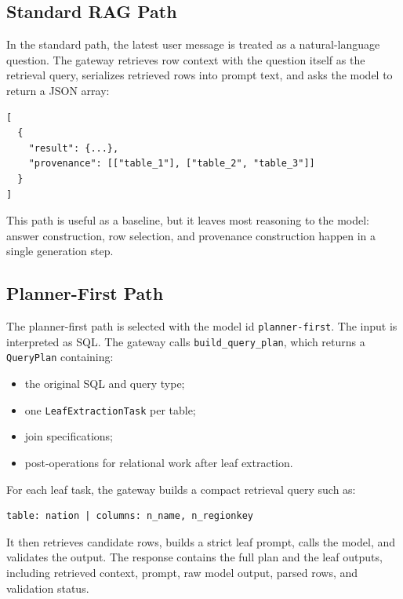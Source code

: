\documentclass[11pt,a4paper]{article}
\begin{document}
\subsection{Standard RAG Path}

In the standard path, the latest user message is treated as a natural-language
question. The gateway retrieves row context with the question itself as the
retrieval query, serializes retrieved rows into prompt text, and asks the model
to return a JSON array:

\begin{lstlisting}[style=codestyle]
[
  {
    "result": {...},
    "provenance": [["table_1"], ["table_2", "table_3"]]
  }
]
\end{lstlisting}

This path is useful as a baseline, but it leaves most reasoning to the model:
answer construction, row selection, and provenance construction happen in a
single generation step.

\subsection{Planner-First Path}

The planner-first path is selected with the model id \texttt{planner-first}. The
input is interpreted as SQL. The gateway calls \texttt{build\_query\_plan}, which
returns a \texttt{QueryPlan} containing:

\begin{itemize}[leftmargin=*]
    \item the original SQL and query type;
    \item one \texttt{LeafExtractionTask} per table;
    \item join specifications;
    \item post-operations for relational work after leaf extraction.
\end{itemize}

For each leaf task, the gateway builds a compact retrieval query such as:

\begin{lstlisting}[style=codestyle]
table: nation | columns: n_name, n_regionkey
\end{lstlisting}

It then retrieves candidate rows, builds a strict leaf prompt, calls the model,
and validates the output. The response contains the full plan and the leaf
outputs, including retrieved context, prompt, raw model output, parsed rows, and
validation status.
\end{document}
